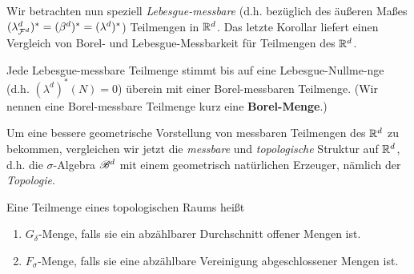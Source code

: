 Wir betrachten nun speziell \emph{Lebesgue-messbare} (d.h. bezüglich des äußeren Maßes $(\lambda^d_{\mathcal{F}^d})^* = (\beta^d)^* = (\lambda^d)^*$) Teilmengen in $\mathbb{R}^d$. Das letzte Korollar liefert einen Vergleich von Borel- und Lebesgue-Messbarkeit für Teilmengen des $\mathbb{R}^d$.

\begin{korollar}
\begin{mdframed}
Jede Lebesgue-messbare Teilmenge stimmt bis auf eine Lebesgue-Nullme-nge (d.h. $(\lambda^d)^*(N)=0$) überein mit einer Borel-messbaren Teilmenge. (Wir nennen eine Borel-messbare Teilmenge kurz eine \textbf{Borel-Menge}.)
\end{mdframed}
\end{korollar}

Um eine bessere geometrische Vorstellung von messbaren Teilmengen des $\mathbb{R}^d$ zu bekommen, vergleichen wir jetzt die \emph{messbare} und \emph{topologische} Struktur auf $\mathbb{R}^d$, d.h. die $\sigma$-Algebra $\mathscr{B}^d$ mit einem geometrisch natürlichen Erzeuger, nämlich der \emph{Topologie}.

\begin{definition}
\begin{mdframed}
Eine Teilmenge eines topologischen Raums heißt
\begin{enumerate}[label=(\roman*),topsep=3pt, itemsep=0pt]
\item $G_\delta$-Menge, falls sie ein abzählbarer Durchschnitt offener Mengen ist.
\item $F_\sigma$-Menge, falls sie eine abzählbare Vereinigung abgeschlossener Mengen ist.
\end{enumerate}
\end{mdframed}
\end{definition}

